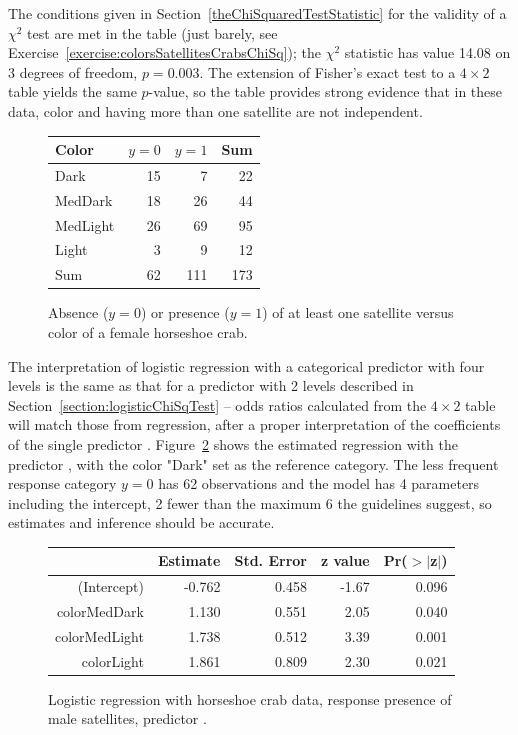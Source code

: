 The conditions given in Section~\ref{theChiSquaredTestStatistic} for the validity of a $\chi^2$ test are met in the table (just barely, see Exercise~\ref{exercise:colorsSatellitesCrabsChiSq}); the $\chi^2$ statistic has value 14.08 on 3 degrees of freedom, $p = 0.003$.  The extension of Fisher's exact test to a $4 \times 2$ table yields the same $p$-value, so the table provides strong evidence that in these data, color and having more than one satellite are not independent.

\begin{figure}[ht]
\centering
\begin{tabular}{lrrr}
Color & $y = 0$ & $y = 1$ & Sum \\ \hline
Dark & 15 & 7 & 22 \\
MedDark & 18 & 26 & 44 \\
MedLight & 26 & 69 & 95 \\
Light & 3 & 9 & 12 \\ \hline
Sum & 62 & 111 & 173
\end{tabular}
\caption{Absence ($y = 0$) or presence ($y = 1$) of at least one satellite versus color of a female horseshoe crab.}
\label{figure:colorSatelliteCrabs}
\end{figure}

The interpretation of logistic regression with a categorical predictor with four levels is the same as that for a predictor with 2 levels described in Section~\ref{section:logisticChiSqTest}  --  odds ratios calculated from the $4 \times 2$ table will match those from regression, after a proper interpretation of the coefficients of the single predictor .  Figure~\ref{figure:satellitesColorCrabsLogReg} shows the estimated regression with the predictor , with the color "Dark" set as the reference category. The less frequent response category $y = 0$ has 62 observations and the model has 4 parameters including the intercept, 2 fewer than the maximum 6 the guidelines suggest, so estimates and inference should be accurate.


\begin{figure}[ht]
\centering
\begin{tabular}{rrrrr}
  \hline
 & Estimate & Std. Error & z value & Pr($>$$|$z$|$) \\
  \hline
(Intercept) & -0.762 & 0.458 & -1.67 & 0.096 \\
  colorMedDark & 1.130 & 0.551 & 2.05 & 0.040 \\
  colorMedLight & 1.738 & 0.512 & 3.39 & 0.001 \\
  colorLight & 1.861 & 0.809 & 2.30 & 0.021 \\
   \hline
\end{tabular}
\caption{Logistic regression with horseshoe crab data, response
       presence of male satellites, predictor .}
\label{figure:satellitesColorCrabsLogReg}
\end{figure}


